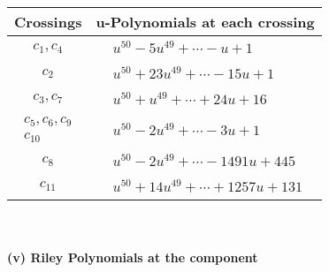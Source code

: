 \documentclass[1p]{elsarticle_modified}
\theoremstyle{definition}
\begin{document}
\begin{tabular}{m{50pt}|m{274pt}}
Crossings & \hspace{64pt}u-Polynomials at each crossing \\
\hline $$\begin{aligned}c_{1},c_{4}\end{aligned}$$&$\begin{aligned}
&u^{50}-5 u^{49}+\cdots- u+1
\end{aligned}$\\
\hline $$\begin{aligned}c_{2}\end{aligned}$$&$\begin{aligned}
&u^{50}+23 u^{49}+\cdots-15 u+1
\end{aligned}$\\
\hline $$\begin{aligned}c_{3},c_{7}\end{aligned}$$&$\begin{aligned}
&u^{50}+u^{49}+\cdots+24 u+16
\end{aligned}$\\
\hline $$\begin{aligned}c_{5},c_{6},c_{9}\\c_{10}\end{aligned}$$&$\begin{aligned}
&u^{50}-2 u^{49}+\cdots-3 u+1
\end{aligned}$\\
\hline $$\begin{aligned}c_{8}\end{aligned}$$&$\begin{aligned}
&u^{50}-2 u^{49}+\cdots-1491 u+445
\end{aligned}$\\
\hline $$\begin{aligned}c_{11}\end{aligned}$$&$\begin{aligned}
&u^{50}+14 u^{49}+\cdots+1257 u+131
\end{aligned}$\\
\hline
\end{tabular}\\~\\
\newpage\renewcommand{\arraystretch}{1}
\flushleft \textbf{(v) Riley Polynomials at the component}\newline \\
\end{document}
